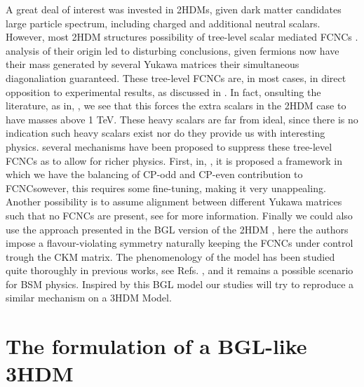 A great deal of interest was invested in 2HDMs, given  dark matter candidates  large particle spectrum, including charged and additional neutral scalars.
%
However,  most 2HDM structures  possibility of tree-level scalar mediated FCNCs . 
% 
 analysis of their origin led to disturbing conclusions, given  fermions now have their mass generated by several Yukawa matrices  their simultaneous diagonaliation  guaranteed. 
%
These tree-level FCNCs are, in most cases, in direct opposition to experimental results, as discussed in . 
%
In fact, onsulting the literature, as in, \cite{Branco:1999fs}, we see that this forces the extra scalars in the 2HDM case to have masses above 1 TeV.
%
These heavy scalars  are far from ideal, since there is no indication such heavy scalars exist nor do they provide us with interesting physics. 
%
 several mechanisms have been proposed to  suppress these tree-level FCNCs as to allow for richer physics. 
%
First, in, \cite{Ferreira_2011,Nebot_2015,ferreira2019strong}, it is proposed a framework in which we have the balancing of CP-odd and CP-even contribution to FCNCsowever, this  requires some fine-tuning, making it very unappealing. 
% 
Another possibility is to assume alignment between different Yukawa matrices such that no FCNCs are present, see \cite{Pich_2009,Jung_2010,Jung_2011} for more information. 
%
Finally we could also use the approach presented in the BGL version of the 2HDM \cite{Branco_1996,LAVOURA1994}, here the authors impose a flavour-violating symmetry naturally keeping the FCNCs under control trough the CKM matrix. 
%
The phenomenology of the model has been studied quite thoroughly in previous works, see Refs. \cite{Botella_2014,Botella_2016}, and it remains a possible scenario for BSM physics.
%
Inspired by this BGL model our studies will try to reproduce a similar mechanism on a 3HDM Model. 


\section{The formulation of a BGL-like 3HDM} 

